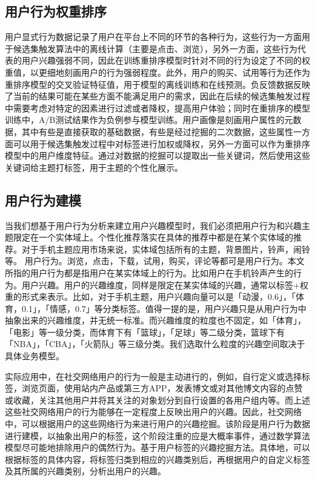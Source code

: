 		\subsection{用户行为权重排序}
		用户显式行为数据记录了用户在平台上不同的环节的各种行为，这些行为一方面用于候选集触发算法中的离线计算（主要是点击、浏览），另外一方面，这些行为代表的用户兴趣强弱不同，因此在训练重排序模型时针对不同的行为设定了不同的权重值，以更细地刻画用户的行为强弱程度。此外，用户的购买、试用等行为还作为重排序模型的交叉验证特征值，用于模型的离线训练和在线预测。负反馈数据反映了当前的结果可能在某些方面不能满足用户的需求，因此在后续的候选集触发过程中需要考虑对特定的因素进行过滤或者降权，提高用户体验；同时在重排序的模型训练中，A/B测试结果作为负例参与模型训练。用户画像是刻画用户属性的元数据，其中有些是直接获取的基础数据，有些是经过挖掘的二次数据，这些属性一方面可以用于候选集触发过程中对标签进行加权或降权，另外一方面可以作为重排序模型中的用户维度特征。通过对数据的挖掘可以提取出一些关键词，然后使用这些关键词给主题打标签，用于主题的个性化展示。

		\subsection{用户行为建模}
		当我们想基于用户行为分析来建立用户兴趣模型时，我们必须把用户行为和兴趣主题限定在一个实体域上。个性化推荐落实在具体的推荐中都是在某个实体域的推荐。对于手机主题应用市场来说，实体域包括所有的主题，背景图片，铃声，闹铃等。  用户行为。浏览，点击，下载，试用，购买，评论等都可是用户行为。本文所指的用户行为都是指用户在某实体域上的行为。比如用户在手机铃声产生的行为。用户兴趣。用户的兴趣维度，同样是限定在某实体域的兴趣，通常以标签+权重的形式来表示。比如，对于手机主题，用户兴趣向量可以是「动漫，0.6」，「体育，0.1」，「情感，0.7」等分类标签。值得一提的是，用户兴趣只是从用户行为中抽象出来的兴趣维度，并无统一标准。而兴趣维度的粒度也不固定，如「体育」，「电影」等一级分类，而体育下有「篮球」，「足球」等二级分类，篮球下有「NBA」，「CBA」，「火箭队」等三级分类。我们选取什么粒度的兴趣空间取决于具体业务模型。
		
		实际应用中，在社交网络用户的行为一般是主动进行的，例如，自行定义或选择标签，浏览页面，使用站内产品或第三方APP，发表博文或对其他博文内容的点赞或收藏，关注其他用户并将其关注的对象划分到自行设置的各用户组内等。而上述这些社交网络用户的行为能够在一定程度上反映出用户的兴趣。因此，社交网络中，可以根据用户的这些网络行为来进行用户的兴趣挖掘。该阶段是用户行为数据进行建模，以抽象出用户的标签，这个阶段注重的应是大概率事件，通过数学算法模型尽可能地排除用户的偶然行为。基于用户标签的兴趣挖掘方法。具体地，可以根据标签的具体内容，将标签归类到相应的兴趣类别后，再根据用户的自定义标签及其所属的兴趣类别，分析出用户的兴趣。

